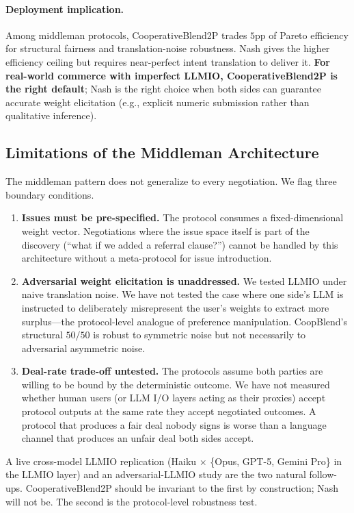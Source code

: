 \documentclass[11pt,a4paper]{article}
\begin{document}
\paragraph{Deployment implication.} Among middleman protocols, CooperativeBlend2P trades $5$pp of Pareto efficiency for structural fairness and translation-noise robustness. Nash gives the higher efficiency ceiling but requires near-perfect intent translation to deliver it. \textbf{For real-world commerce with imperfect LLMIO, CooperativeBlend2P is the right default}; Nash is the right choice when both sides can guarantee accurate weight elicitation (e.g., explicit numeric submission rather than qualitative inference).

\subsection{Limitations of the Middleman Architecture}
\label{sec:middleman_limits}

The middleman pattern does not generalize to every negotiation. We flag three boundary conditions.

\begin{enumerate}
\item \textbf{Issues must be pre-specified.} The protocol consumes a fixed-dimensional weight vector. Negotiations where the issue space itself is part of the discovery (``what if we added a referral clause?'') cannot be handled by this architecture without a meta-protocol for issue introduction.
\item \textbf{Adversarial weight elicitation is unaddressed.} We tested LLMIO under naive translation noise. We have not tested the case where one side's LLM is instructed to deliberately misrepresent the user's weights to extract more surplus---the protocol-level analogue of preference manipulation. CoopBlend's structural $50/50$ is robust to symmetric noise but not necessarily to adversarial asymmetric noise.
\item \textbf{Deal-rate trade-off untested.} The protocols assume both parties are willing to be bound by the deterministic outcome. We have not measured whether human users (or LLM I/O layers acting as their proxies) accept protocol outputs at the same rate they accept negotiated outcomes. A protocol that produces a fair deal nobody signs is worse than a language channel that produces an unfair deal both sides accept.
\end{enumerate}

A live cross-model LLMIO replication (Haiku $\times$ \{Opus, GPT-5, Gemini Pro\} in the LLMIO layer) and an adversarial-LLMIO study are the two natural follow-ups. CooperativeBlend2P should be invariant to the first by construction; Nash will not be. The second is the protocol-level robustness test.
\end{document}
